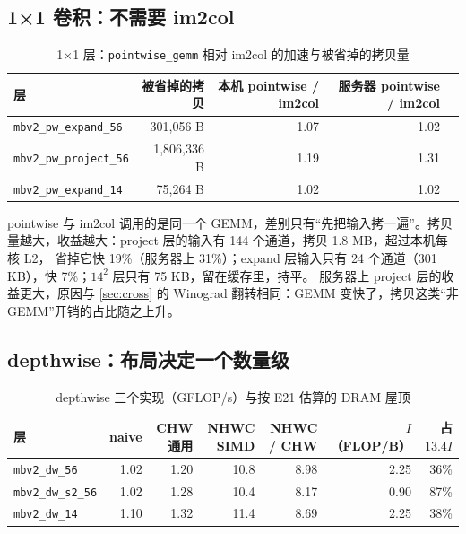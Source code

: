 \documentclass[11pt,a4paper]{ctexart}
\begin{document}
\subsection{1×1 卷积：不需要 im2col}\label{sec:res-pw}

\begin{table}[H]
\centering\small
\caption{1×1 层：\texttt{pointwise\_gemm} 相对 im2col 的加速与被省掉的拷贝量}\label{tab:pw}
\begin{tabular}{lrrrr}
\toprule
层 & 被省掉的拷贝 & 本机 pointwise / im2col & 服务器 pointwise / im2col \\
\midrule
\texttt{mbv2\_pw\_expand\_56} & 301,056 B & 1.07 & 1.02 \\
\texttt{mbv2\_pw\_project\_56} & 1,806,336 B & 1.19 & 1.31 \\
\texttt{mbv2\_pw\_expand\_14} & 75,264 B & 1.02 & 1.02 \\
\bottomrule
\end{tabular}
\end{table}

pointwise 与 im2col 调用的是同一个 GEMM，差别只有“先把输入拷一遍”。拷贝量越大，收益越大：project 层的输入有 144 个通道，拷贝 1.8 MB，超过本机每核 L2，
省掉它快 19\%（服务器上 31\%）；expand 层输入只有 24 个通道（301 KB），快 7\%；$14^2$ 层只有 75 KB，留在缓存里，持平。
服务器上 project 层的收益更大，原因与 \cref{sec:cross} 的 Winograd 翻转相同：GEMM 变快了，拷贝这类“非 GEMM”开销的占比随之上升。

\subsection{depthwise：布局决定一个数量级}\label{sec:res-dw}

\begin{table}[H]
\centering\small
\caption{depthwise 三个实现（GFLOP/s）与按 E21 估算的 DRAM 屋顶}\label{tab:dw}
\begin{tabular}{lrrrrrr}
\toprule
层 & naive & CHW 通用 & NHWC SIMD & NHWC / CHW & $I$（FLOP/B） & 占 $13.4I$ \\
\midrule
\texttt{mbv2\_dw\_56} & 1.02 & 1.20 & 10.8 & 8.98 & 2.25 & 36\% \\
\texttt{mbv2\_dw\_s2\_56} & 1.02 & 1.28 & 10.4 & 8.17 & 0.90 & 87\% \\
\texttt{mbv2\_dw\_14} & 1.10 & 1.32 & 11.4 & 8.69 & 2.25 & 38\% \\
\bottomrule
\end{tabular}
\end{table}
\end{document}
